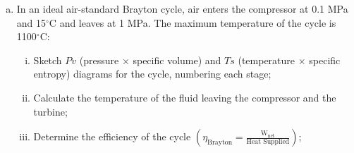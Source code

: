 \documentclass[calculator,steamtables,refrigeranttables,psychrometricchart,datasheet,solutions]{exam}
\newcommand{\frc}{\displaystyle\frac}
\begin{document}
\begin{question}
\begin{enumerate}[(a)]
\item In an ideal air-standard Brayton cycle, air enters the compressor at 0.1 MPa and 15$^{\circ}$C and leaves at 1 MPa. The maximum temperature of the cycle is 1100$^{\circ}$C:
\begin{enumerate}[(i)]
\item Sketch $Pv$ (pressure $\times$ specific volume) and $Ts$ (temperature $\times$ specific entropy) diagrams for the cycle, numbering each stage;~
%
\item Calculate the temperature of the fluid leaving the compressor and the turbine;~
%
\item Determine the efficiency of the cycle $\left(\eta_{\text{Brayton}}=\frc{\text{W}_{\text{net}}}{\text{Heat Supplied}}\right)$;~

\end{enumerate}
\end{enumerate}
\end{question}
\end{document}
